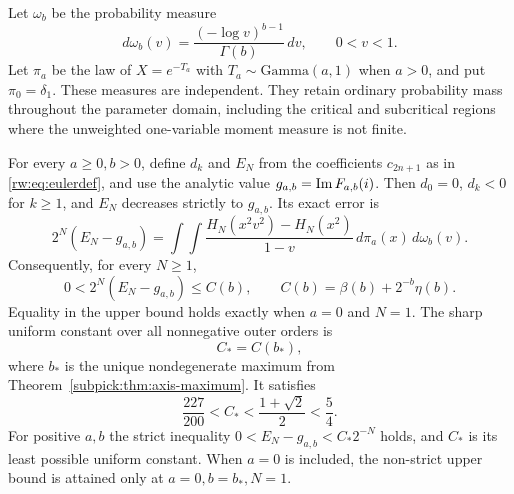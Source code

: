 Let $\omega_b$ be the probability measure
\[
 d\omega_b(v)=\frac{(-\log v)^{b-1}}{\Gamma(b)}\,dv,
 \qquad 0<v<1.
\]
Let $\pi_a$ be the law of $X=e^{-T_a}$ with
$T_a\sim\mathrm{Gamma}(a,1)$ when $a>0$, and put $\pi_0=\delta_1$.
These measures are independent. They retain ordinary probability mass
throughout the parameter domain, including the critical and subcritical
regions where the unweighted one-variable moment measure is not finite.

\begin{theorem}
\label{univeuler:thm:sharp}
For every $a\ge0,b>0$, define $d_k$ and $E_N$ from the coefficients
$c_{2n+1}$ as in \eqref{rw:eq:eulerdef}, and use the analytic value
$g_{a,b}=\operatorname{Im} F_{a,b}(i)$. Then $d_0=0$, $d_k<0$ for $k\ge1$,
and $E_N$ decreases strictly to $g_{a,b}$. Its exact error is
\begin{equation}\label{univeuler:eq:tail}
 2^N(E_N-g_{a,b})=
 \int\!\!\int
 \frac{H_N(x^2v^2)-H_N(x^2)}{1-v}\,d\pi_a(x)\,d\omega_b(v).
\end{equation}
Consequently, for every $N\ge1$,
\begin{equation}\label{univeuler:eq:axisbudget}
 0<2^N(E_N-g_{a,b})\le C(b),\qquad
 C(b)=\beta(b)+2^{-b}\eta(b).
\end{equation}
Equality in the upper bound holds exactly when $a=0$ and $N=1$.
The sharp uniform constant over all nonnegative outer orders is
\[
 C_* = C(b_*),
\]
where $b_*$ is the unique nondegenerate maximum from
Theorem~\ref{subpick:thm:axis-maximum}. It satisfies
\[
 \frac{227}{200}<C_*<\frac{1+\sqrt2}{2}<\frac54.
\]
For positive $a,b$ the strict inequality
$0<E_N-g_{a,b}<C_*2^{-N}$ holds, and $C_*$ is its least possible
uniform constant. When $a=0$ is included, the non-strict upper bound
is attained only at $a=0,b=b_*,N=1$.
\end{theorem}
